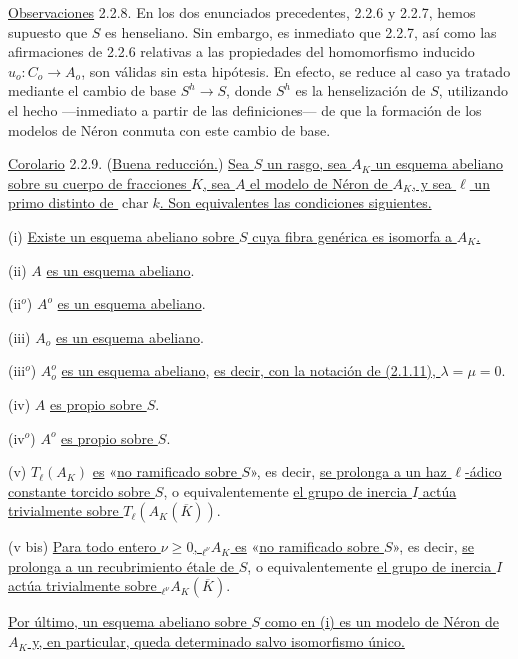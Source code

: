 \medskip
\noindent
\underline{Observaciones} 2.2.8. En los dos enunciados precedentes,
2.2.6 y 2.2.7, hemos supuesto que $S$ es henseliano. Sin embargo, es
inmediato que 2.2.7, así como las afirmaciones de 2.2.6 relativas a las
propiedades del homomorfismo inducido
$u_o:C_o\longrightarrow A_o$, son válidas sin esta hipótesis. En
efecto, se reduce al caso ya tratado mediante el cambio de base
$S^h\longrightarrow S$, donde $S^h$ es la henselización de $S$,
utilizando el hecho ---inmediato a partir de las definiciones--- de que
la formación de los modelos de Néron conmuta con este cambio de base.

\medskip
\noindent
\underline{Corolario} 2.2.9. (\underline{Buena reducción.})
\underline{Sea $S$ un rasgo, sea $A_K$ un esquema abeliano sobre su
cuerpo de fracciones $K$, sea $A$ el modelo de Néron de $A_K$, y sea
$\ell$ un primo distinto de $\operatorname{char}k$. Son equivalentes
las condiciones siguientes.}

\smallskip
\noindent
(i) \underline{Existe un esquema abeliano sobre $S$ cuya fibra genérica
es isomorfa a $A_K$.}

\noindent
(ii) $A$ \underline{es un esquema abeliano}.

\noindent
(ii$^o$) $A^o$ \underline{es un esquema abeliano}.

\noindent
(iii) $A_o$ \underline{es un esquema abeliano}.

\noindent
(iii$^o$) $A_o^o$ \underline{es un esquema abeliano}, \underline{es
decir, con la notación de (2.1.11), $\lambda=\mu=0$}.

\noindent
(iv) $A$ \underline{es propio sobre $S$}.

\noindent
(iv$^o$) $A^o$ \underline{es propio sobre $S$}.

\noindent
(v) $T_\ell(A_K)$ \underline{es} «\underline{no ramificado sobre $S$}», es decir,
\underline{se prolonga a un haz $\ell$-ádico constante torcido sobre
$S$}, o equivalentemente \underline{el grupo de inercia $I$ actúa
trivialmente sobre $T_\ell(A_K(\overline K))$}.

\noindent
(v bis) \underline{Para todo entero $\nu\geq0$,
${}_{\ell^\nu}A_K$ es} «\underline{no ramificado sobre $S$}», es decir,
\underline{se prolonga a un recubrimiento étale de $S$}, o
equivalentemente \underline{el grupo de inercia $I$ actúa trivialmente
sobre ${}_{\ell^\nu}A_K(\overline K)$}.

\smallskip
\noindent
\underline{Por último, un esquema abeliano sobre $S$ como en (i) es un
modelo de Néron de $A_K$ y, en particular, queda determinado salvo
isomorfismo único.}

